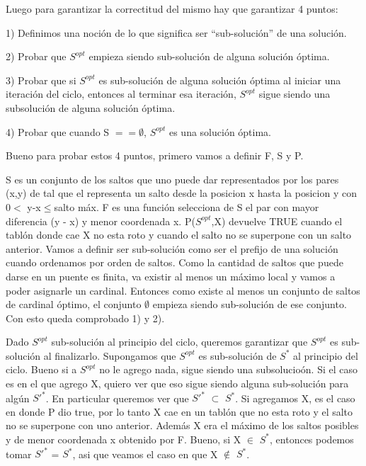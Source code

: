 Luego para garantizar la correctitud del mismo hay que garantizar 4 puntos:


1) Definimos una noci\'on de lo que significa ser “sub-soluci\'on” de una soluci\'on.

2) Probar que $S^{opt}$ empieza siendo sub-soluci\'on de alguna soluci\'on \'optima.

3) Probar que si  $S^{opt}$ es sub-soluci\'on de alguna soluci\'on \'optima al iniciar 	una iteraci\'on del ciclo, entonces al terminar  esa iteraci\'on, $S^{opt}$ sigue siendo una subsoluci\'on de alguna soluci\'on \'optima.

4) Probar que cuando S $== \emptyset$, $S^{opt}$ es una soluci\'on \'optima.

Bueno para probar estos 4 puntos, primero vamos a definir F, S y P.


S es un conjunto de los saltos que uno puede dar representados por los pares (x,y) de tal que el representa un salto desde la posicion x hasta la posicion y con 0$<$ y-x$\leq$salto m\'ax.
F es una funci\'on selecciona de S el par con mayor diferencia (y - x) y menor coordenada x.
P($S^{opt}$,X) devuelve TRUE cuando el tabl\'on donde cae X no esta roto y cuando el salto no se superpone con un salto anterior.
Vamos a definir ser sub-soluci\'on como ser el prefijo de una soluci\'on cuando ordenamos por orden de saltos.
Como la cantidad de saltos que puede darse en un puente es finita, va existir al menos un m\'aximo local y vamos a poder asignarle un cardinal. Entonces como existe al menos un conjunto de saltos de cardinal \'optimo, el conjunto $\emptyset$ empieza siendo sub-soluci\'on de ese conjunto.
Con esto queda comprobado 1) y 2).

Dado $S^{opt}$ sub-soluci\'on al principio del ciclo, queremos garantizar que $S^{opt}$ es sub-soluci\'on al finalizarlo.
Supongamos que $S^{opt}$ es sub-soluci\'on de $S^{*}$ al principio del ciclo.
Bueno si a $S^{opt}$ no le agrego nada, sigue siendo una subsolucio\'on.
Si el caso es en el que agrego X, quiero ver que eso sigue siendo alguna sub-soluci\'on para alg\'un $S'^{*}$. En particular queremos ver que $S'^{*}$ $\subset$ $S^{*}$. 
Si agregamos X, es el caso en donde P dio true, por lo tanto X cae en un tabl\'on que no esta roto y el salto no se superpone con uno anterior.
Adem\'as X era el m\'aximo de los saltos posibles y de menor coordenada x obtenido por F.
Bueno, si X $\in$ $S^{*}$, entonces podemos tomar $S'^{*}$ = $S^{*}$, asi que veamos el caso en que X $\notin$ $S^{*}$.

